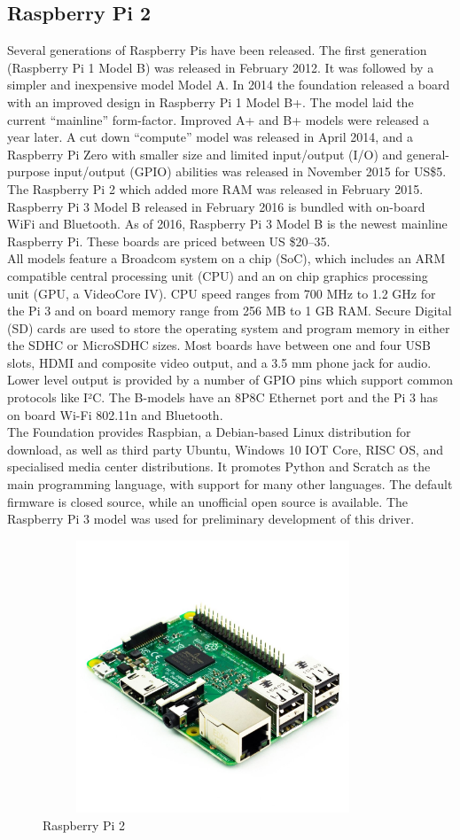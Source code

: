 \subsection{Raspberry Pi 2}
Several generations of Raspberry Pis have been released. The first generation (Raspberry Pi 1 Model B) was released in February 2012. It was followed by a simpler and inexpensive model Model A. In 2014 the foundation released a board with an improved design in Raspberry Pi 1 Model B+. The model laid the current ``mainline'' form-factor. Improved A+ and B+ models were released a year later. A cut down ``compute'' model was released in April 2014, and a Raspberry Pi Zero with smaller size and limited input/output (I/O) and general-purpose input/output (GPIO) abilities was released in November 2015 for US\$5. The Raspberry Pi 2 which added more RAM was released in February 2015. Raspberry Pi 3 Model B released in February 2016 is bundled with on-board WiFi and Bluetooth. As of 2016, Raspberry Pi 3 Model B is the newest mainline Raspberry Pi. These boards are priced between US \$20–35.\\
All models feature a Broadcom system on a chip (SoC), which includes an ARM compatible central processing unit (CPU) and an on chip graphics processing unit (GPU, a VideoCore IV). CPU speed ranges from 700 MHz to 1.2 GHz for the Pi 3 and on board memory range from 256 MB to 1 GB RAM. Secure Digital (SD) cards are used to store the operating system and program memory in either the SDHC or MicroSDHC sizes. Most boards have between one and four USB slots, HDMI and composite video output, and a 3.5 mm phone jack for audio. Lower level output is provided by a number of GPIO pins which support common protocols like I²C. The B-models have an 8P8C Ethernet port and the Pi 3 has on board Wi-Fi 802.11n and Bluetooth.\\
The Foundation provides Raspbian, a Debian-based Linux distribution for download, as well as third party Ubuntu, Windows 10 IOT Core, RISC OS, and specialised media center distributions. It promotes Python and Scratch as the main programming language, with support for many other languages. The default firmware is closed source, while an unofficial open source is available.
The Raspberry Pi 3 model was used for preliminary development of this driver.
\begin{figure}[H]
	\centering
	\includegraphics[width=4.0in, height=3.2in]{images/raspberry_pi.png}
	\caption{Raspberry Pi 2}
\end{figure}

